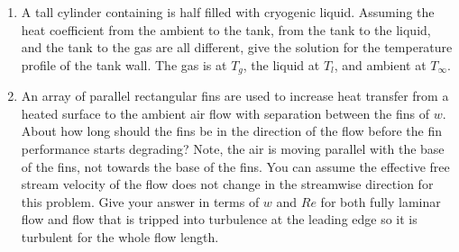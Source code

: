 \documentclass[12pt,letterpaper]{article}
\begin{document}
\begin{enumerate}
    \item A tall cylinder containing is half filled with cryogenic liquid.
        Assuming the heat coefficient from the ambient to the tank, from the tank to the liquid, and the tank to the gas are all different, give the solution for the temperature profile of the tank wall.
        The gas is at $T_g$, the liquid at $T_l$, and ambient at $T_\infty$.
    \newpage

   \item An array of parallel rectangular fins are used to increase heat transfer from a heated surface to the ambient air flow with separation between the fins of $w$.
       About how long should the fins be in the direction of the flow before the fin performance starts degrading?
       Note, the air is moving parallel with the base of the fins, not towards the base of the fins.
       You can assume the effective free stream velocity of the flow does not change in the streamwise direction for this problem.
       Give your answer in terms of $w$ and $\mathit{Re}$ for both fully laminar flow and flow that is tripped into turbulence at the leading edge so it is turbulent for the whole flow length.
\end{enumerate}
\end{document}

